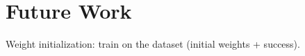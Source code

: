 
\section*{Future Work} 

Weight initialization: train on the dataset (initial weights + success). 

